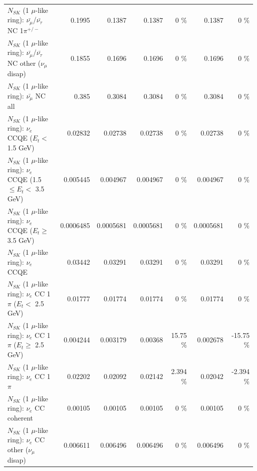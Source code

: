 \begin{table}
\begin{tabular}{| l | r | r | r  r | r  r |}
\hline
  $N_{SK}$ (1 $\mu$-like ring): $\bar{\nu_\mu}$/$\bar{\nu_\tau}$ NC 1$\pi^{+/-}$ &          0.1995 &          0.1387 &          0.1387 &        0 \%  &          0.1387 &        0 \%  \\ 
$N_{SK}$ (1 $\mu$-like ring): $\bar{\nu_\mu}$/$\bar{\nu_\tau}$ NC other ($\nu_\mu$ disap) &          0.1855 &          0.1696 &          0.1696 &        0 \%  &          0.1696 &        0 \%  \\ 
                          $N_{SK}$ (1 $\mu$-like ring): $\bar{\nu_{\mu}}$ NC all &           0.385 &          0.3084 &          0.3084 &        0 \%  &          0.3084 &        0 \%  \\ 
\hline
\hline
\hline
                  $N_{SK}$ (1 $\mu$-like ring): $\nu_e$ CCQE ($E_{t} <$ 1.5 GeV) &         0.02832 &         0.02738 &         0.02738 &        0 \%  &         0.02738 &        0 \%  \\ 
         $N_{SK}$ (1 $\mu$-like ring): $\nu_e$ CCQE (1.5 $\leq E_{t} <$ 3.5 GeV) &        0.005445 &        0.004967 &        0.004967 &        0 \%  &        0.004967 &        0 \%  \\ 
               $N_{SK}$ (1 $\mu$-like ring): $\nu_e$ CCQE ($E_{t} \geq$ 3.5 GeV) &       0.0006485 &       0.0005681 &       0.0005681 &        0 \%  &       0.0005681 &        0 \%  \\ 
\hline
                                      $N_{SK}$ (1 $\mu$-like ring): $\nu_e$ CCQE &         0.03442 &         0.03291 &         0.03291 &        0 \%  &         0.03291 &        0 \%  \\ 
\hline
             $N_{SK}$ (1 $\mu$-like ring): $\nu_e$ CC 1$\pi$ ($E_{t} <$ 2.5 GeV) &         0.01777 &         0.01774 &         0.01774 &        0 \%  &         0.01774 &        0 \%  \\ 
          $N_{SK}$ (1 $\mu$-like ring): $\nu_e$ CC 1$\pi$ ($E_{t} \geq$ 2.5 GeV) &        0.004244 &        0.003179 &         0.00368 &    15.75 \%  &        0.002678 &   -15.75 \%  \\ 
\hline
                                 $N_{SK}$ (1 $\mu$-like ring): $\nu_e$ CC 1$\pi$ &         0.02202 &         0.02092 &         0.02142 &    2.394 \%  &         0.02042 &   -2.394 \%  \\ 
                               $N_{SK}$ (1 $\mu$-like ring): $\nu_e$ CC coherent &         0.00105 &         0.00105 &         0.00105 &        0 \%  &         0.00105 &        0 \%  \\ 
                $N_{SK}$ (1 $\mu$-like ring): $\nu_e$ CC other ($\nu_\mu$ disap) &        0.006611 &        0.006496 &        0.006496 &        0 \%  &        0.006496 &        0 \%  \\ 

\end{tabular}
\end{table}
